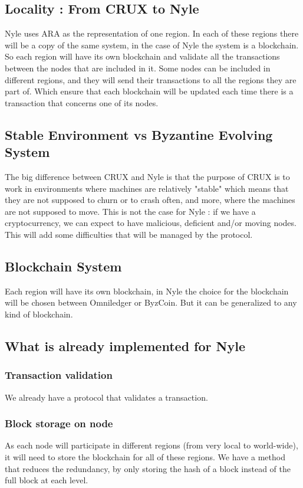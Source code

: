 \documentclass[a4paper,11pt,oneside]{report}
\begin{document}
\subsection{Locality : From CRUX to Nyle} Nyle uses ARA as the representation
of one region. In each of these regions there will be a copy of the same
system, in the case of Nyle the system is a blockchain. So each region will
have its own blockchain and validate all the transactions between the nodes
that are included in it. Some nodes can be included in different regions, and
they will send their transactions to all the regions they are part of. Which
ensure that each blockchain will be updated each time there is a transaction
that concerns one of its nodes.

\subsection{Stable Environment vs Byzantine Evolving System}

The big difference between CRUX and Nyle is that the purpose of CRUX is to work
in environments where machines are relatively "stable" which means that they
are not supposed to churn or to crash often, and more, where the machines are
not supposed to move. This is not the case for Nyle : if we have a
cryptocurrency, we can expect to have malicious, deficient and/or moving nodes.
This will add some difficulties that will be managed by the protocol.

\subsection{Blockchain System} \label{blockchain_subsection}

Each region will have its own blockchain, in Nyle the choice for the blockchain
will be chosen between Omniledger or ByzCoin. But it can be generalized to any
kind of blockchain.

\subsection{What is already implemented for Nyle} \subsubsection{Transaction
validation} We already have a protocol that validates a transaction.

\subsubsection{Block storage on node} As each node will participate in
different regions (from very local to world-wide), it will need to store the
blockchain for all of these regions. We have a method that reduces the
redundancy, by only storing the hash of a block instead of the full block at
each level. 
\end{document}
